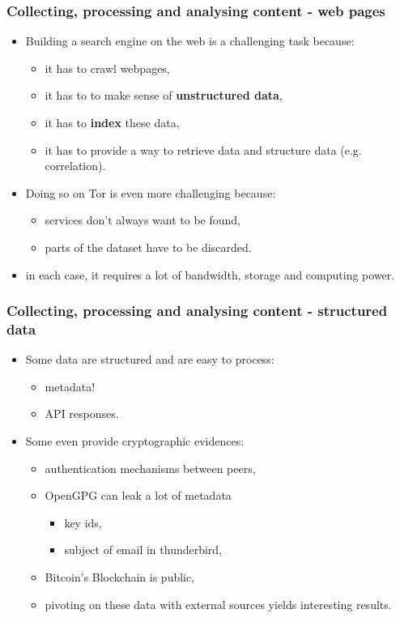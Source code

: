\documentclass[10pt,aspectratio=169, colorlinks=true, linkcolor=circlBlue]{beamer}
\begin{document}
\begin{frame}
        \frametitle{Collecting, processing and analysing content - web pages}
        \begin{itemize}
		\item Building a search engine on the web is a challenging task because:
        	\begin{itemize}
			\item it has to crawl webpages,
			\item it has to to make sense of {\bf unstructured data},
			\item it has to {\bf index} these data,
			\item it has to provide a way to retrieve data and structure data (e.g. correlation).
        	\end{itemize}
		\item Doing so on Tor is even more challenging because:

        	\begin{itemize}
			\item services don't always want to be found,
			\item parts of the dataset have to be discarded.
        	\end{itemize}
	\item in each case, it requires a lot of bandwidth, storage and computing power.
        \end{itemize}
\end{frame}


\begin{frame}
        \frametitle{Collecting, processing and analysing content - structured data}
        \begin{itemize}
		\item Some data are structured and are easy to process:
        	\begin{itemize}
			\item metadata!
			\item API responses.
        	\end{itemize}
		\item Some even provide cryptographic evidences:
			        \begin{itemize}

         \item authentication mechanisms between peers,
         \item OpenGPG can leak a lot of metadata
        \begin{itemize}
          \item key ids,
          \item subject of email in thunderbird,
        \end{itemize}
          \item Bitcoin's Blockchain is public,
          \item pivoting on these data with external sources yields interesting results.
        \end{itemize}


        \end{itemize}
\end{frame}
\end{document}
